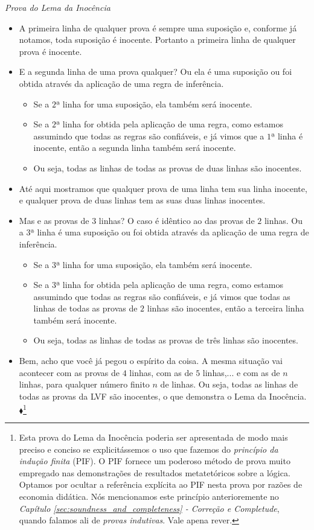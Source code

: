 	
\emph{Prova do Lema da Inocência}
\begin{itemize}
	\item A primeira linha de qualquer prova é sempre uma suposição e, conforme já notamos, toda suposição é inocente. Portanto a primeira linha de qualquer prova é inocente.
	\item E a segunda linha de uma prova qualquer? Ou ela é uma suposição ou foi obtida através da aplicação de uma regra de inferência.
		\begin{itemize} 
			\item Se a $2$ª linha for uma suposição, ela também será inocente.
			\item Se a $2$ª linha for obtida pela aplicação de uma regra, como estamos assumindo que todas as regras são confiáveis, e já vimos que a $1$ª linha é inocente, então a segunda linha também será inocente.
			\item Ou seja, todas as linhas de todas as provas de duas linhas são inocentes.
		\end{itemize}
	\item Até aqui mostramos que qualquer prova de uma linha tem sua linha inocente, e qualquer prova de duas linhas tem as suas duas linhas inocentes.
	\item Mas e as provas de $3$ linhas? O caso é idêntico ao das provas de $2$ linhas. Ou a $3$ª linha é uma suposição ou foi obtida através da aplicação de uma regra de inferência.
		\begin{itemize} 
			\item Se a $3$ª linha for uma suposição, ela também será inocente.
			\item Se a $3$ª linha for obtida pela aplicação de uma regra, como estamos assumindo que todas as regras são confiáveis, e já vimos que todas as linhas de todas as provas de $2$ linhas são inocentes, então a terceira linha também será inocente.
			\item Ou seja, todas as linhas de todas as provas de três linhas são inocentes.
		\end{itemize}
	\item Bem, acho que você já pegou o espírito da coisa. A mesma situação vai acontecer com as provas de $4$ linhas, com as de $5$ linhas,... e com as de $n$ linhas, para qualquer número finito $n$ de linhas. Ou seja, todas as linhas de todas as provas da LVF são inocentes, o que demonstra o Lema da Inocência.$\blacklozenge$\footnote{
		Esta prova do Lema da Inocência poderia ser apresentada de modo mais preciso e conciso se explicitássemos o uso que fazemos do \textit{princípio da indução finita} (PIF). O PIF fornece um poderoso método de prova muito empregado nas demonstrações de resultados metatetóricos sobre a lógica. Optamos por ocultar a referência explícita ao PIF nesta prova por razões de economia didática. Nós mencionamos este princípio anterioremente no \textit{Capítulo \ref{sec:soundness_and_completeness} - Correção e Completude}, quando falamos ali de \textit{provas indutivas}. Vale apena rever.}
\end{itemize}

